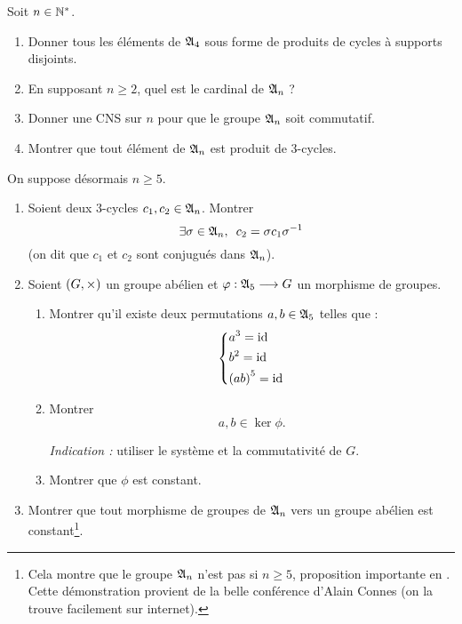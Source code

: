 \begin{exo}
Soit \(n\in\mathbb{N}^*\).

\begin{enumerate}[series=exoAn]
\item Donner tous les éléments de \(\frak{A}_{4}\) sous forme de produits de cycles à supports disjoints. \\

\item En supposant \(n\geq2\), quel est le cardinal de \(\frak{A}_{n}\) ? \\

\item Donner une CNS sur \(n\) pour que le groupe \(\frak{A}_{n}\) soit commutatif. \\

\item Montrer que tout élément de \(\frak{A}_{n}\) est produit de \(3\)-cycles.
\end{enumerate}

On suppose désormais \(n\geq5\).

\begin{enumerate}[resume=exoAn]
\item Soient deux \(3\)-cycles \(c_1,c_2\in\frak{A}_{n}\). Montrer \[\quantifs{\exists\sigma\in\frakA{n}}c_2=\sigma c_1\sigma\inv\] (on dit que \(c_1\) et \(c_2\) sont conjugués dans \(\frak{A}_{n}\)). \\

\item Soient \(\groupe{G}[\times]\) un groupe abélien et \(\varphi:\frak{A}_{5}\longrightarrow G\) un morphisme de groupes.

\begin{enumerate}
\item Montrer qu'il existe deux permutations \(a,b\in\frak{A}_{5}\) telles que : \[\begin{dcases}a^3=\mathrm{id}_{} \\ b^2=\mathrm{id}_{} \\ \left(ab\right)^5=\mathrm{id}_{}\end{dcases}\]

\item Montrer \[a,b\in\ker\phi.\]

\textit{Indication :} utiliser le système et la commutativité de \(G\). \\

\item Montrer que \(\phi\) est constant. \\
\end{enumerate}

\item Montrer que tout morphisme de groupes de \(\frak{A}_{n}\) vers un groupe abélien est constant\footnote{Cela montre que le groupe \(\frak{A}_{n}\) n'est pas  si \(n\geq5\), proposition importante en . Cette démonstration provient de la belle conférence d'Alain Connes  (on la trouve facilement sur internet).}.
\end{enumerate}
\end{exo}

